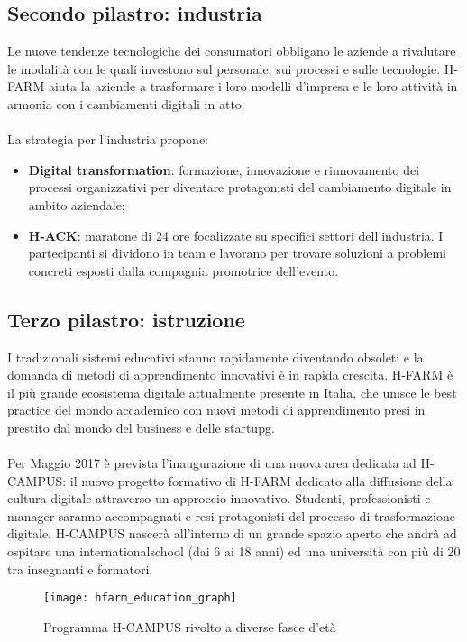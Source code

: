 \subsection{Secondo pilastro: industria}
Le nuove tendenze tecnologiche dei consumatori obbligano le aziende a rivalutare le modalità con le quali investono sul personale, sui processi e sulle tecnologie. H-FARM aiuta la aziende a trasformare i loro modelli d'impresa e le loro attività in armonia con i cambiamenti digitali in atto.
\\ \\
La strategia per l’industria propone:
\begin{itemize}
\item \textbf{Digital transformation}: formazione, innovazione e rinnovamento dei processi organizzativi per diventare protagonisti del cambiamento digitale in ambito aziendale;
\item \textbf{H-ACK}: maratone di 24 ore focalizzate su specifici settori dell'industria. I partecipanti si dividono in team e lavorano per trovare soluzioni a problemi concreti esposti dalla compagnia promotrice dell'evento.
\end{itemize}

\subsection{Terzo pilastro: istruzione}
I tradizionali sistemi educativi stanno rapidamente diventando obsoleti e la domanda di metodi di apprendimento innovativi è in rapida crescita. H-FARM è il più grande ecosistema digitale attualmente presente in Italia, che unisce le best practice del mondo accademico con nuovi metodi di apprendimento presi in prestito dal mondo del business e delle \gls{startupg}\glsfirstoccur.
\\ \\
Per Maggio 2017 è prevista l'inaugurazione di una nuova area dedicata ad H-CAMPUS: il nuovo progetto formativo di H-FARM dedicato alla diffusione della cultura digitale attraverso un approccio innovativo. 
Studenti, professionisti e manager saranno accompagnati e resi protagonisti del processo di trasformazione digitale.
H-CAMPUS nascerà all'interno di un grande spazio aperto che andrà ad ospitare una \gls{internationalschool}\glsfirstoccur{} (dai 6 ai 18 anni) ed una università con più di 20 tra insegnanti e formatori.

\begin{figure}[htbp]
\begin{center}
\texttt{[image: hfarm\_education\_graph]}
\caption{Programma H-CAMPUS rivolto a diverse fasce d'età}
\end{center}
\end{figure}

